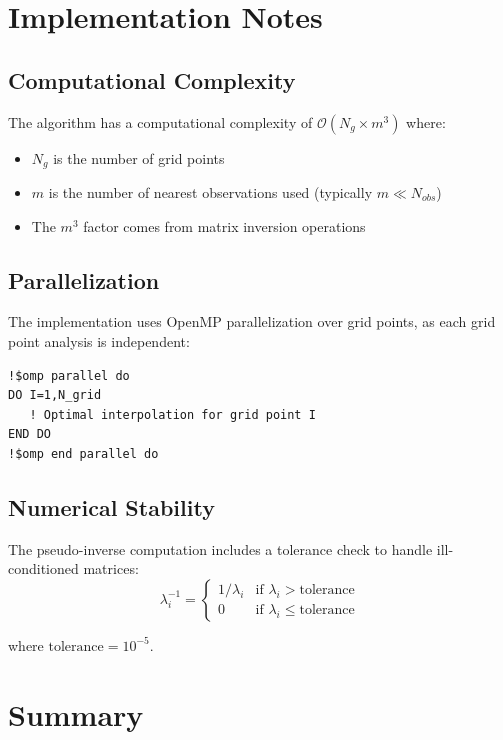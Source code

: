 \documentclass[11pt]{article}
\begin{document}
\section{Implementation Notes}

\subsection{Computational Complexity}

The algorithm has a computational complexity of $\mathcal{O}(N_g \times m^3)$ where:
\begin{itemize}
    \item $N_g$ is the number of grid points
    \item $m$ is the number of nearest observations used (typically $m \ll N_{obs}$)
    \item The $m^3$ factor comes from matrix inversion operations
\end{itemize}

\subsection{Parallelization}

The implementation uses OpenMP parallelization over grid points, as each grid point analysis is independent:
\begin{verbatim}
!$omp parallel do
DO I=1,N_grid
   ! Optimal interpolation for grid point I
END DO
!$omp end parallel do
\end{verbatim}

\subsection{Numerical Stability}

The pseudo-inverse computation includes a tolerance check to handle ill-conditioned matrices:
\begin{equation}
\lambda_i^{-1} = \begin{cases}
1/\lambda_i & \text{if } \lambda_i > \text{tolerance} \\
0 & \text{if } \lambda_i \leq \text{tolerance}
\end{cases}
\end{equation}

where $\text{tolerance} = 10^{-5}$.

\section{Summary}
\end{document}
